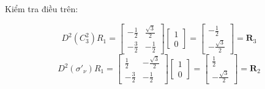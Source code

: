 \documentclass{article}
\begin{document}
Kiểm tra điều trên:

\[
    \renewcommand{\arraystretch}{0.75}
    D^2\left(C_3^2\right)R_1 =
    \begin{bmatrix}
        -\frac{1}{2} & \frac{\sqrt{3}}{2} \\
        -\frac{3}{2} & -\frac{1}{2}
    \end{bmatrix}
    \begin{bmatrix}
        1 \\
        0
    \end{bmatrix}
    =
    \begin{bmatrix}
        -\frac{1}{2} \\
        -\frac{\sqrt{3}}{2}
    \end{bmatrix}
    = \textbf{R}_3
\]
\[
    \renewcommand{\arraystretch}{0.75}
    D^2\left(\sigma'_\nu\right)R_1 =
    \begin{bmatrix}
        \frac{1}{2}  & -\frac{\sqrt{3}}{2} \\
        -\frac{3}{2} & -\frac{1}{2}
    \end{bmatrix}
    \begin{bmatrix}
        1 \\
        0
    \end{bmatrix}
    =
    \begin{bmatrix}
        \frac{1}{2} \\
        -\frac{\sqrt{3}}{2}
    \end{bmatrix}
    = \textbf{R}_2
\]
\end{document}
